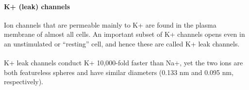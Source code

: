 \documentclass[../main.tex]{subfiles}
\begin{document}
\begin{figure}[H]
	\centering
	\caption{}
\end{figure} 


\paragraph{K+ (leak) channels}
Ion channels that are permeable mainly to K+ are found in the plasma membrane of almost all cells. An important subset of K+ channels opens even in an unstimulated or “resting” cell, and hence these are called K+ leak channels.\\
\\
K+ leak channels conduct K+ 10,000-fold faster than Na+, yet the two ions are both featureless spheres and have similar diameters (0.133 nm and 0.095 nm, respectively).
\end{document}
